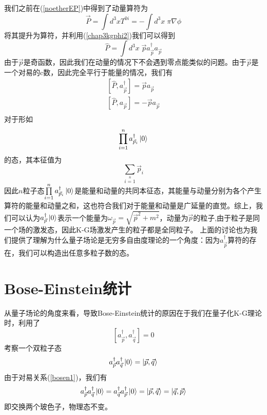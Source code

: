 我们之前在(\ref{noetherEP})中得到了动量算符为
\begin{equation}
    \vec{P}=\int d^{3}x T^{0i}=-\int d^{3}x\;\pi\nabla \phi
\end{equation}
将其提升为算符，并利用(\ref{chap3kgphi2})我们可以得到
\begin{equation}
\label{chap3momenoper}
    \hat{P}=\int d^{3}x\;\vec{p}a_{\vec{p}}^{\dagger}a_{\vec{p}}
\end{equation}
由于$\vec{p}$是奇函数，因此我们在动量的情况下不会遇到零点能类似的问题。由于$\vec{p}$是一个对易的c数，因此完全平行于能量的情况，我们有
\begin{equation}
\begin{aligned}
\left[\hat{P},a_{\vec{p}}^{\dagger}\right]=\vec{p}a_{\vec{p}}\\
    \left[\hat{P},a_{\vec{p}}\right]=-\vec{p}a_{\vec{p}}\\
    \end{aligned}
\end{equation}
对于形如
\begin{equation}
    \prod\limits_{i=1}\limits^{n}a^{\dagger}_{\vec{p}_{i}}\ket{0}
\end{equation}
的态，其本征值为
\begin{equation}
\sum\limits_{i=1}\limits^{n}\vec{p}_{i}
\end{equation}
因此$n$粒子态$\prod\limits_{i=1}\limits^{n}a^{\dagger}_{\vec{p}_{i}}\ket{0}$是能量和动量的共同本征态，其能量与动量分别为各个产生算符的能量和动量之和，这也符合我们对于能量和动量是广延量的直觉。综上，我们可以认为$a^{\dagger}_{\vec{p}}\ket{0}$表示一个能量为$\omega_{\vec{p}}=\sqrt{\vec{p}^{2}+m^{2}}$，动量为$\vec{p}$的粒子,由于粒子是同一个场的激发态，因此K-G场激发产生的粒子都是全同粒子。
上面的讨论也为我们提供了理解为什么量子场论是无穷多自由度理论的一个角度：因为$a^{\dagger}_{\vec{p}}$算符的存在，我们可以构造出任意多粒子数的态。

\section{Bose-Einstein统计}
从量子场论的角度来看，导致Bose-Einstein统计的原因在于我们在量子化K-G理论时，利用了
\begin{equation}
\label{bosen1}
    \left[a^{\dagger}_{\vec{p}},a^{\dagger}_{\vec{q}}\right]=0
\end{equation}
考察一个双粒子态
\begin{equation}
    a_{\vec{p}}^{\dagger}a_{\vec{q}}^{\dagger}\ket{0}=\ket{\vec{p},\vec{q}}
\end{equation}
由于对易关系(\ref{bosen1})，我们有
\begin{equation}
    a_{\vec{p}}^{\dagger}a_{\vec{q}}^{\dagger}\ket{0}= a_{\vec{q}}^{\dagger}a_{\vec{p}}^{\dagger}\ket{0}=\ket{\vec{p},\vec{q}}=\ket{\vec{q},\vec{p}}
\end{equation}
即交换两个玻色子，物理态不变。

